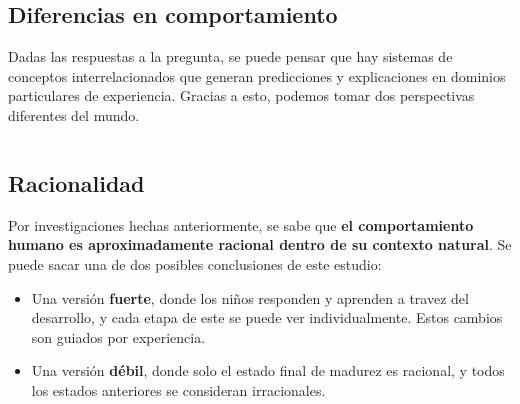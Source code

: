 \documentclass{beamer}
\begin{document}
\subsection{Diferencias en comportamiento}

\begin{frame}[fragile]
Dadas las respuestas a la pregunta, se puede pensar que hay sistemas de conceptos interrelacionados que generan predicciones y explicaciones en dominios particulares de experiencia\cite{murphy93}. Gracias a esto, podemos tomar dos perspectivas diferentes del mundo.

\vspace{2em}

\begin{columns}[T]
\begin{column}{.4\textwidth}
\end{column}

\begin{column}{.5\textwidth}
\end{column}
\end{columns}

\end{frame}

\subsection{Racionalidad}

\begin{frame}[fragile]
Por investigaciones hechas anteriormente, se sabe que \textbf{el comportamiento humano es aproximadamente racional dentro de su contexto natural}\cite{anterson90}. Se puede sacar una de dos posibles conclusiones de este estudio:

\begin{itemize}
\item Una versión \textbf{fuerte}, donde los niños responden y aprenden a travez del desarrollo, y cada etapa de este se puede ver individualmente. Estos cambios son guiados por experiencia.
\item Una versión \textbf{débil}, donde solo el estado final de madurez es racional, y todos los estados anteriores se consideran irracionales.
\end{itemize}

\end{frame}
\end{document}
